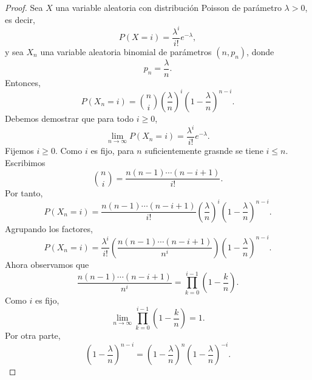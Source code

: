 \documentclass[12pt,a4paper]{article}
\newcommand{\paren}[1]{\left( #1 \right)}
\begin{document}
    \begin{proof}
        Sea $X$ una variable aleatoria con distribución Poisson de parámetro $\lambda\gt0$,
        es decir,
        \begin{equation*}
            P(X=i)=\frac{\lambda^{i}}{i!}e^{-\lambda},
        \end{equation*}
        y sea $X_{n}$ una variable aleatoria binomial de parámetros $(n,p_{n})$, donde
        \begin{equation*}
            p_{n}=\frac{\lambda}{n}.
        \end{equation*}
        Entonces,
        \begin{equation*}
            P(X_{n}=i)=\binom{n}{i}\paren{\frac{\lambda}{n}}^{i}\paren{1-\frac{\lambda}{n}}^{n-i}.
        \end{equation*}
        Debemos demostrar que para todo $i\geq0$,
        \begin{equation*}
            \lim_{n\to\infty}P(X_{n}=i)=\frac{\lambda^{i}}{i!}e^{-\lambda}.
        \end{equation*}
        Fijemos $i\geq0$. Como $i$ es fijo, para $n$ suficientemente grasnde se tiene $i\leq n$.
        Escribimos
        \begin{equation*}
            \binom{n}{i}=\frac{n(n-1)\cdots(n-i+1)}{i!}.
        \end{equation*}
        Por tanto,
        \begin{equation*}
            P(X_{n}=i)=\frac{n(n-1)\cdots(n-i+1)}{i!}\paren{\frac{\lambda}{n}}^{i}\paren{1-\frac{\lambda}{n}}^{n-i}.
        \end{equation*}
        Agrupando los factores,
        \begin{equation*}
            P(X_{n}=i)=\frac{\lambda^{i}}{i!}\paren{\frac{n(n-1)\cdots(n-i+1)}{n^{i}}}\paren{1-\frac{\lambda}{n}}^{n-i}.
        \end{equation*}
        Ahora observamos que
        \begin{equation*}
            \frac{n(n-1)\cdots(n-i+1)}{n^{i}}=\prod_{k=0}^{i-1}\paren{1-\frac{k}{n}}.
        \end{equation*}
        Como $i$ es fijo,
        \begin{equation*}
            \lim_{n\to\infty}\prod_{k=0}^{i-1}\paren{1-\frac{k}{n}}=1.
        \end{equation*}
        Por otra parte,
        \begin{equation*}
            \paren{1-\frac{\lambda}{n}}^{n-i}=\paren{1-\frac{\lambda}{n}}^{n}\paren{1-\frac{\lambda}{n}}^{-i}.

\end{equation*}
\end{proof}
\end{document}
